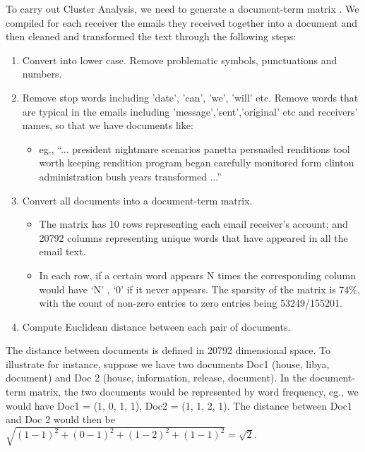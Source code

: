 To carry out Cluster Analysis, we need to generate a document-term matrix \cite{document-term2015}. 
We compiled for each receiver the emails they received together into a document and then cleaned and transformed the text through the following steps:
\singlespacing
\begin{enumerate}
\item Convert into lower case. Remove problematic symbols, punctuations and numbers.
\item Remove stop words including 'date', 'can', 'we', 'will' etc. Remove words that are typical in the emails including 'message','sent','original' etc and receivers' names, so that we have documents like:
\begin{itemize}
\item eg., ``... president nightmare scenarios panetta persuaded renditions tool worth keeping rendition program began carefully monitored form clinton administration bush years transformed ...''
\end{itemize}
\item Convert all documents into a document-term matrix.
\begin{itemize} 
\item The matrix has 10 rows representing each email receiver's account; and 20792 columns representing unique words that have appeared in all the email text.
\item In each row, if a certain word appears N times the corresponding column would have `N' , `0' if it never appears. The sparsity of the matrix is 74\%, with the count of non-zero entries to zero entries being 53249/155201. 
\end{itemize}
\item Compute Euclidean distance between each pair of documents.
\end{enumerate}
\doublespacing
The distance between documents is defined in 20792 dimensional space. To illustrate for instance, suppose we have two documents Doc1 (house, libya, document) and Doc 2 (house, information, release, document). In the document-term matrix, the two documents would be represented by word frequency, eg., we would have Doc1 = (1, 0, 1, 1), Doc2 = (1, 1, 2, 1). The distance between Doc1 and Doc 2 would then be $\sqrt{(1-1)^{2} + (0-1)^{2} + (1-2)^{2} + (1-1)^{2}} = \sqrt{2}$.


